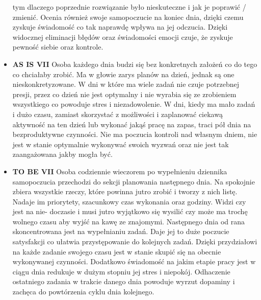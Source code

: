 \begin{itemize}
          tym dlaczego poprzednie rozwiązanie było nieskuteczne i jak je
          poprawić / zmienić. Ocenia również swoje samopoczucie na koniec dnia,
          dzięki czemu zyskuje świadomość co tak naprawdę wpływa na jej
          odczucia. Dzięki widocznej eliminacji błędów oraz świadomości emocji
          czuje, że zyskuje pewność siebie oraz kontrole.
    \item \textbf{AS IS VII} Osoba każdego dnia budzi się bez konkretnych
          założeń co do tego co chciałaby zrobić. Ma w głowie zarys planów na
          dzień, jednak są one nieskonkretyzowane. W dni w które ma wiele zadań
          nie czuje potrzebnej presji, przez co dzień nie jest optymalny i nie
          wyrabia się ze zrobieniem wszystkiego co powoduje stres i
          niezadowolenie. W dni, kiedy ma mało zadań i dużo czasu, zamiast
          skorzystać z możliwości i zaplanować ciekawą aktywność na ten dzień
          lub wykonać jakąś pracę na zapas, traci pół dnia na bezproduktywne
          czynności. Nie ma poczucia kontroli nad własnym dniem, nie jest w
          stanie optymalnie wykonywać swoich wyzwań oraz nie jest tak
          zaangażowana jakby mogła być.
    \item \textbf{TO BE VII} Osoba codziennie wieczorem po wypełnieniu dziennika
          samopoczucia przechodzi do sekcji planowania następnego dnia. Na
          spokojnie zbiera wszystkie rzeczy, które powinna jutro zrobić i tworzy
          z nich listę. Nadaje im priorytety, szacunkowy czas wykonania oraz
          godziny. Widzi czy jest na nie- doczasie i musi jutro wyjątkowo się
          wysilić czy może ma trochę wolnego czasu aby wyjść na kawę ze
          znajomymi. Następnego dnia od rana skoncentrowana jest na wypełnianiu
          zadań. Daje jej to duże poczucie satysfakcji co ułatwia przystępowanie
          do kolejnych zadań. Dzięki przydziałowi na każde zadanie swojego czasu
          jest w stanie skupić się na obecnie wykonywanej czynności. Dodatkowo
          świadomość na jakim etapie pracy jest w ciągu dnia redukuje w dużym
          stopniu jej stres i niepokój. Odhaczenie ostatniego zadania w trakcie
          danego dnia powoduje wyrzut dopaminy i zachęca do powtórzenia cyklu
          dnia kolejnego.
\end{itemize}


